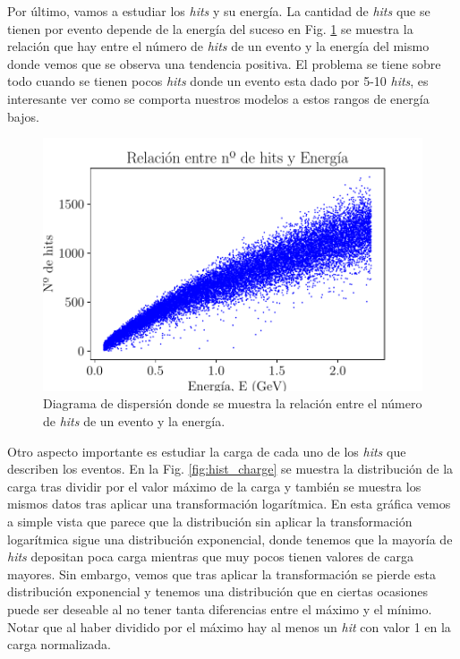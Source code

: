 \documentclass[a4paper,12pt,twoside,titlepage]{article}
\begin{document}
Por último, vamos a estudiar los \textit{hits} y su energía. La cantidad de \textit{hits} que se tienen por evento depende de la energía del suceso en Fig. \ref{fig:scatter_n_e} se muestra la relación que hay entre el número de \textit{hits} de un evento y la energía del mismo donde vemos que se observa una tendencia positiva. El problema se tiene sobre todo cuando se tienen pocos \textit{hits} donde un evento esta dado por 5-10 \textit{hits}, es interesante ver como se comporta nuestros modelos a estos rangos de energía bajos.

\begin{figure}[h!]
  \centering
  \includegraphics[scale=0.85]{scatter_n_e.pdf}
  \caption{Diagrama de dispersión donde se muestra la relación entre el número de \textit{hits} de un evento y la energía.}
  \label{fig:scatter_n_e}
\end{figure}


Otro aspecto importante es estudiar la carga de cada uno de los \textit{hits} que describen los eventos. En la Fig. \ref{fig:hist_charge} se muestra la distribución de la carga tras dividir por el valor máximo de la carga y también se muestra los mismos datos tras aplicar una transformación logarítmica. En esta gráfica vemos a simple vista que parece que la distribución sin aplicar la transformación logarítmica sigue una distribución exponencial, donde tenemos que la mayoría de \textit{hits} depositan poca carga mientras que muy pocos tienen valores de carga mayores. Sin embargo, vemos que tras aplicar la transformación se pierde esta distribución exponencial y tenemos una distribución que en ciertas ocasiones puede ser deseable al no tener tanta diferencias entre el máximo y el mínimo. Notar que al haber dividido por el máximo hay al menos un \textit{hit} con valor 1 en la carga normalizada.
\end{document}

